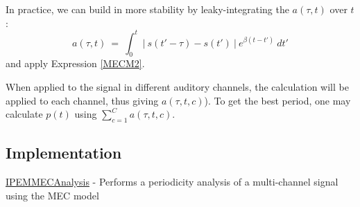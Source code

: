In practice, we can build in more stability by leaky-integrating
the $a(\tau,t)$ over $t$:
\begin{equation}\label{MECM1B}
  a(\tau,t)~=~
   \int_{0}^{t}~\left|~
   s(t'-\tau)-s(t') ~\right|~
  e^{\beta(t-t')}~dt'
\end{equation}
and apply Expression \ref{MECM2}.

When applied to the signal in different auditory channels, the
calculation will be applied to each channel, thus giving
$a(\tau,t,c)$). To get the best period, one may calculate $p(t)$
using $\sum_{c=1}^{C}a(\tau,t,c)$.

\subsection*{Implementation}
\hyperlink{FuncRef:IPEMMECAnalysis}{IPEMMECAnalysis} - Performs a
periodicity analysis of a multi-channel signal using the MEC model

